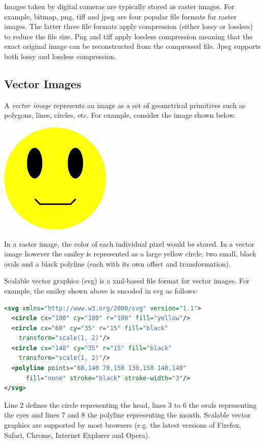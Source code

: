 \documentclass{book}
\begin{document}
Images taken by digital cameras are typically stored as raster images. For example, bitmap, png, tiff and jpeg are four popular file formats for raster images. The latter three file formats apply compression (either lossy or lossless) to reduce the file size. Png and tiff apply lossless compression meaning that the exact original image can be reconstructed from the compressed file. Jpeg supports both lossy and lossless compression.

\subsection{Vector Images}
A \emph{vector image} represents an image as a set of geometrical primitives such as polygons, lines, circles, etc. For example, consider the image shown below. 

\begin{center}
\includegraphics[scale=0.3]{smiley.png}
\end{center}

In a raster image, the color of each individual pixel would be stored. In a vector image however the smiley is represented as a large yellow circle, two small, black ovals and a black polyline (each with its own offset and transformation).

Scalable vector graphics (svg) is a xml-based file format for vector images. For example, the smiley shown above is encoded in svg as follows:  
\begin{lstlisting}[language=xml,basicstyle=\ttfamily\small]
<svg xmlns="http://www.w3.org/2000/svg" version="1.1">
  <circle cx="100" cy="100" r="100" fill="yellow"/>
  <circle cx="60" cy="35" r="15" fill="black" 
    transform="scale(1, 2)"/>
  <circle cx="140" cy="35" r="15" fill="black"
    transform="scale(1, 2)"/>
  <polyline points="60,140 70,150 130,150 140,140" 
      fill="none" stroke="black" stroke-width="3"/>
</svg>
\end{lstlisting}
Line 2 defines the circle representing the head, lines 3 to 6 the ovals representing the eyes and lines 7 and 8 the polyline representing the mouth. Scalable vector graphics are supported by most browsers (e.g. the latest versions of Firefox, Safari, Chrome, Internet Explorer and Opera).
\end{document}
